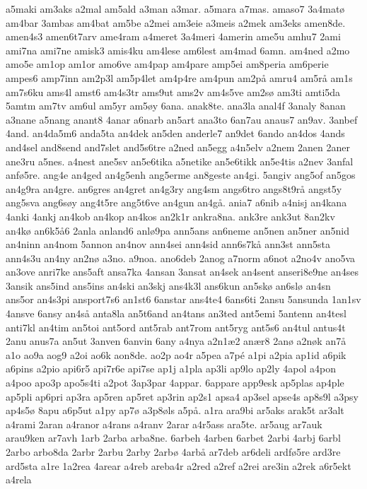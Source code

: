 {a5maki
am3aks
a2mal
am5ald
a3man
a3mar.
a5mara
a7mas.
amaso7
3a4mat^^f8
am4bar
3ambas
am4bat
am5be
a2mei
am3eie
a3meis
a2mek
am3eks
amen8de.
amen4s3
amen6t7arv
ame4ram
a4meret
3a4meri
4amerin
ame5u
amhu7
2ami
ami7na
ami7ne
amisk3
amis4ku
am4lese
am6lest
am4mad
6amn.
am4ned
a2mo
amo5e
am1op
am1or
amo6ve
am4pap
am4pare
amp5ei
am8peria
am6perie
ampes6
amp7inn
am2p3l
am5p4let
am4p4re
am4pun
am2p^^e5
amru4
am5r^^e5
am1s
am7s6ku
ams4l
amst6
am4s3tr
ams9ut
ams2v
am4s5ve
am2s^^f8
am3ti
amti5da
5amtm
am7tv
am6ul
am5yr
am5^^f8y
6ana.
anak8te.
ana3la
anal4f
3analy
8anan
a3nane
a5nang
anant8
4anar
a6narb
an5art
ana3to
6an7au
anaus7
an9av.
3anbef
4and.
an4da5m6
anda5ta
an4dek
an5den
anderle7
an9det
6ando
an4dos
4ands
and4sel
and8send
and7slet
and5s6tre
a2ned
an5egg
a4n5elv
a2nem
2anen
2aner
ane3ru
a5nes.
a4nest
ane5sv
an5e6tika
a5netike
an5e6tikk
an5e4tis
a2nev
3anfal
anf^^f85re.
ang4e
an4ged
an4g5enh
ang5erme
an8geste
an4gi.
5angiv
ang5of
an5gos
an4g9ra
an4gre.
an6gres
an4gret
an4g3ry
ang4sm
angs6tro
angs8t9r^^e5
angst5y
ang5sva
ang6s^^f8y
ang4t5re
ang5t6ve
an4gun
an4g^^e5.
ania7
a6nib
a4nisj
an4kana
4anki
4ankj
an4kob
an4kop
an4kos
an2k1r
ankra8na.
ank3re
ank3ut
8an2kv
an4k^^f8
an6k5^^e56
2anla
anland6
anl^^f89pa
ann5ans
an6neme
an5nen
an5ner
an5nid
an4ninn
an4nom
5annon
an4nov
ann4sei
ann4sid
ann6s7k^^e5
ann3st
ann5sta
ann4s3u
an4ny
an2n^^f8
a3no.
a9noa.
ano6deb
2anog
a7norm
a6not
a2no4v
ano5va
an3ove
anri7ke
ans5aft
ansa7ka
4ansan
3ansat
an4sek
an4sent
anseri8e9ne
an4ses
3ansik
ans5ind
ans5ins
an4ski
an3skj
ans4k3l
ans6kun
an5sk^^f8
an6sl^^f8
an4sn
ans5or
an4s3pi
ansport7s6
an1st6
6anstar
ans4te4
6ans6ti	
2ansu
5ansunda
1an1sv
4ansve
6ansy
an4s^^e5
anta8la
an5t6and
an4tans
an3ted
ant5emi
5antenn
an4tesl
anti7kl
an4tim
an5toi
ant5ord
ant5rab
ant7rom
ant5ryg
ant5s6
an4tul
antus4t
2anu
anus7a
an5ut
3anven
6anvin
6any
a4nya
a2n1^^e62
an^^e6r8
2an^^f8
a2n^^f8k
an7^^e5
a1o
ao9a
aog9
a2oi
ao6k
aon8de.
ao2p
ao4r
a5pea
a7p^^e9
a1pi
a2pia
ap1id
a6pik
a6pins
a2pio
api6r5
api7r6e
api7se
ap1j
a1pla
ap3li
ap9lo
ap2ly
4apol
a4pon
a4poo
apo3p
apo5s4ti
a2pot
3ap3par
4appar.
6appare
app9esk
ap5plas
ap4ple
ap5pli
ap6pri
ap3ra
ap5ren
ap5ret
ap3rin
ap2s1
apsa4
ap3sel
apse4s
ap8s9l
a3psy
ap4s5^^f8
8apu
a6p5ut
a1py
ap7^^f8
a3p8^^f8ls
a5p^^e5.
a1ra
ara9bi
ar5aks
arak5t
ar3alt
a4rami
2aran
a4ranor
a4rans
a4ranv
2arar
a4r5ass
ara5te.
ar5aug
ar7auk
arau9ken
ar7avh
1arb
2arba
arba8ne.
6arbeh
4arben
6arbet
2arbi
4arbj
6arbl
2arbo
arbo8da
2arbr
2arbu
2arby
2arb^^f8
4arb^^e5
ar7deb
ar6deli
ardf^^f85re
ard3re
ard5sta
a1re
1a2rea
4arear
a4reb
areba4r
a2red
a2ref
a2rei
are3in
a2rek
a6r5ekt
a4rela
}
